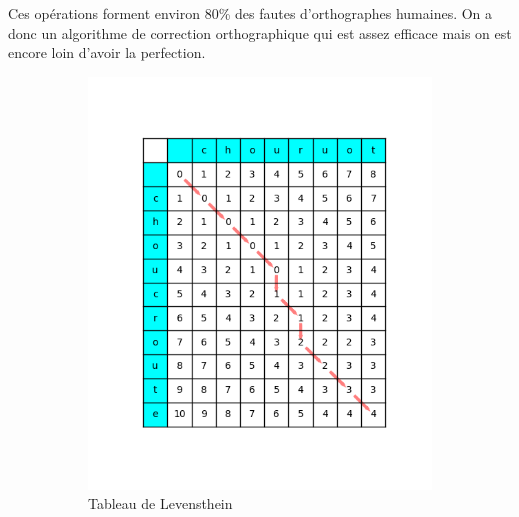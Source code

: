 \documentclass[final, 10pt]{report}
\begin{document}
    Ces opérations forment environ 80\% des fautes d'orthographes humaines.
    On a donc un algorithme de correction orthographique qui est assez efficace mais on est encore loin d'avoir la perfection.
    \begin{figure}
        \centering
        \begin{subfigure}{0.4\textwidth}
            \includegraphics[height=0.4\textheight]{img/Tableau_de_Levenshtein.png}
            \caption{Tableau de Levensthein}
            \label{fig:tab_levensthein}
        \end{subfigure}
        \begin{subfigure}{0.4\textwidth}

\end{subfigure}
\end{figure}
\end{document}

